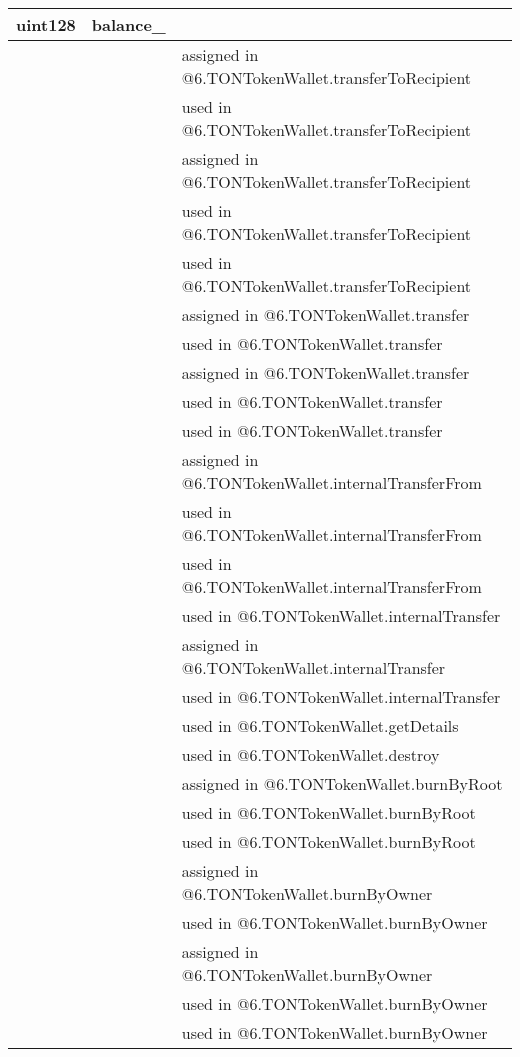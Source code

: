 \ifsoltables
\noindent\begin{tabular}{|l|l|p{5cm}|}\hline
uint128 & balance\_{} &  \\\hline
 & & assigned in @6.TONTokenWallet.transferToRecipient\\\hline
 & & used in @6.TONTokenWallet.transferToRecipient\\\hline
 & & assigned in @6.TONTokenWallet.transferToRecipient\\\hline
 & & used in @6.TONTokenWallet.transferToRecipient\\\hline
 & & used in @6.TONTokenWallet.transferToRecipient\\\hline
 & & assigned in @6.TONTokenWallet.transfer\\\hline
 & & used in @6.TONTokenWallet.transfer\\\hline
 & & assigned in @6.TONTokenWallet.transfer\\\hline
 & & used in @6.TONTokenWallet.transfer\\\hline
 & & used in @6.TONTokenWallet.transfer\\\hline
 & & assigned in @6.TONTokenWallet.internalTransferFrom\\\hline
 & & used in @6.TONTokenWallet.internalTransferFrom\\\hline
 & & used in @6.TONTokenWallet.internalTransferFrom\\\hline
 & & used in @6.TONTokenWallet.internalTransfer\\\hline
 & & assigned in @6.TONTokenWallet.internalTransfer\\\hline
 & & used in @6.TONTokenWallet.internalTransfer\\\hline
 & & used in @6.TONTokenWallet.getDetails\\\hline
 & & used in @6.TONTokenWallet.destroy\\\hline
 & & assigned in @6.TONTokenWallet.burnByRoot\\\hline
 & & used in @6.TONTokenWallet.burnByRoot\\\hline
 & & used in @6.TONTokenWallet.burnByRoot\\\hline
 & & assigned in @6.TONTokenWallet.burnByOwner\\\hline
 & & used in @6.TONTokenWallet.burnByOwner\\\hline
 & & assigned in @6.TONTokenWallet.burnByOwner\\\hline
 & & used in @6.TONTokenWallet.burnByOwner\\\hline
 & & used in @6.TONTokenWallet.burnByOwner\\\hline

\end{tabular}
